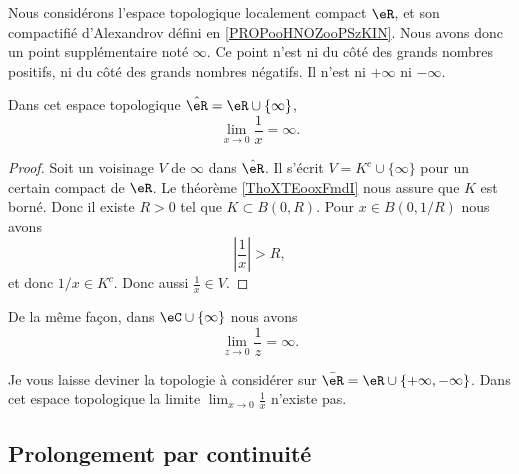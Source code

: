 Nous considérons l'espace topologique localement compact \( \eR\), et son compactifié d'Alexandrov défini en \ref{PROPooHNOZooPSzKIN}. Nous avons donc un point supplémentaire noté \( \infty\). Ce point n'est ni du côté des grands nombres positifs, ni du côté des grands nombres négatifs. Il n'est ni \( +\infty\) ni \( -\infty\).

\begin{proposition}
	Dans cet espace topologique \( \hat \eR=\eR\cup\{ \infty \}\),
	\begin{equation}
		\lim_{x\to 0} \frac{1}{ x }=\infty.
	\end{equation}
\end{proposition}

\begin{proof}
	Soit un voisinage \( V\) de \( \infty\) dans \( \hat \eR\). Il s'écrit \( V=K^c\cup\{ \infty \}\) pour un certain compact de \( \eR\). Le théorème \ref{ThoXTEooxFmdI} nous assure que \( K\) est borné. Donc il existe \( R>0\) tel que \( K\subset B(0,R)\). Pour \( x\in B(0,1/R)\) nous avons
	\begin{equation}
		\left| \frac{1}{ x } \right|>R,
	\end{equation}
	et donc \( 1/x\in K^c\). Donc aussi \( \frac{1}{ x }\in V\).
\end{proof}

De la même façon, dans \( \eC\cup\{ \infty \}\) nous avons
\begin{equation}
	\lim_{z\to 0} \frac{1}{ z }=\infty.
\end{equation}

\begin{normaltext}
	Je vous laisse deviner la topologie à considérer sur \( \bar \eR=\eR\cup\{ +\infty,-\infty \}\). Dans cet espace topologique la limite \( \lim_{x\to 0} \frac{1}{ x }\) n'existe pas.
\end{normaltext}

\subsection{Prolongement par continuité}

